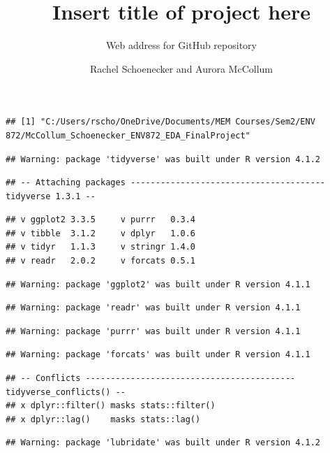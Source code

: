 \documentclass[
  12pt,
]{article}
\title{Insert title of project here}
\subtitle{Web address for GitHub repository}
\author{Rachel Schoenecker and Aurora McCollum}
\date{}
\begin{document}
\maketitle

\newpage
\tableofcontents 
\newpage
\listoftables 
\newpage
\listoffigures 
\newpage

\begin{verbatim}
## [1] "C:/Users/rscho/OneDrive/Documents/MEM Courses/Sem2/ENV 872/McCollum_Schoenecker_ENV872_EDA_FinalProject"
\end{verbatim}

\begin{verbatim}
## Warning: package 'tidyverse' was built under R version 4.1.2
\end{verbatim}

\begin{verbatim}
## -- Attaching packages --------------------------------------- tidyverse 1.3.1 --
\end{verbatim}

\begin{verbatim}
## v ggplot2 3.3.5     v purrr   0.3.4
## v tibble  3.1.2     v dplyr   1.0.6
## v tidyr   1.1.3     v stringr 1.4.0
## v readr   2.0.2     v forcats 0.5.1
\end{verbatim}

\begin{verbatim}
## Warning: package 'ggplot2' was built under R version 4.1.1
\end{verbatim}

\begin{verbatim}
## Warning: package 'readr' was built under R version 4.1.1
\end{verbatim}

\begin{verbatim}
## Warning: package 'purrr' was built under R version 4.1.1
\end{verbatim}

\begin{verbatim}
## Warning: package 'forcats' was built under R version 4.1.1
\end{verbatim}

\begin{verbatim}
## -- Conflicts ------------------------------------------ tidyverse_conflicts() --
## x dplyr::filter() masks stats::filter()
## x dplyr::lag()    masks stats::lag()
\end{verbatim}

\begin{verbatim}
## Warning: package 'lubridate' was built under R version 4.1.2
\end{verbatim}
\end{document}
